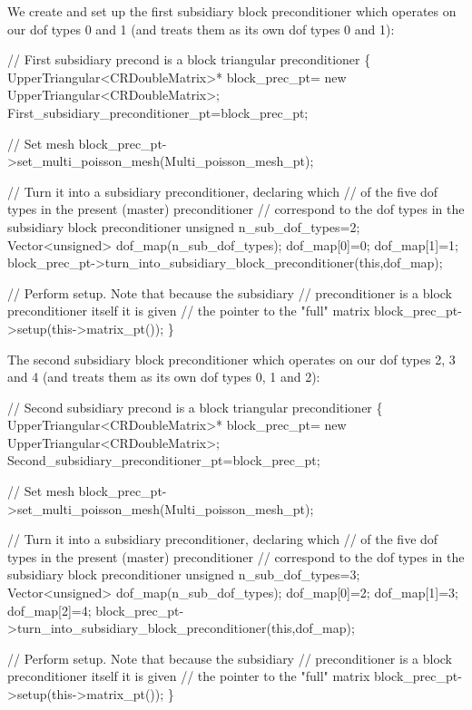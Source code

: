 We create and set up the first subsidiary block preconditioner which operates on our dof types 0 and 1 (and treats them as its own dof types 0 and 1)\+: 
\begin{DoxyCodeInclude}
  \textcolor{comment}{// First subsidiary precond is a block triangular preconditioner}
  \{
   UpperTriangular<CRDoubleMatrix>* block\_prec\_pt=
    \textcolor{keyword}{new} UpperTriangular<CRDoubleMatrix>;
   First\_subsidiary\_preconditioner\_pt=block\_prec\_pt;
  
   \textcolor{comment}{// Set mesh}
   block\_prec\_pt->set\_multi\_poisson\_mesh(Multi\_poisson\_mesh\_pt);
   
   \textcolor{comment}{// Turn it into a subsidiary preconditioner, declaring which}
   \textcolor{comment}{// of the five dof types in the present (master) preconditioner}
   \textcolor{comment}{// correspond to the dof types in the subsidiary block preconditioner}
   \textcolor{keywordtype}{unsigned} n\_sub\_dof\_types=2;
   Vector<unsigned> dof\_map(n\_sub\_dof\_types);
   dof\_map[0]=0;
   dof\_map[1]=1;
   block\_prec\_pt->turn\_into\_subsidiary\_block\_preconditioner(\textcolor{keyword}{this},dof\_map);

    \textcolor{comment}{// Perform setup. Note that because the subsidiary}
   \textcolor{comment}{// preconditioner is a block preconditioner itself it is given}
   \textcolor{comment}{// the pointer to the "full" matrix}
   block\_prec\_pt->setup(this->matrix\_pt());
  \}

\end{DoxyCodeInclude}


The second subsidiary block preconditioner which operates on our dof types 2, 3 and 4 (and treats them as its own dof types 0, 1 and 2)\+:


\begin{DoxyCodeInclude}
  \textcolor{comment}{// Second subsidiary precond is a block triangular preconditioner}
  \{
   UpperTriangular<CRDoubleMatrix>* block\_prec\_pt=
    \textcolor{keyword}{new} UpperTriangular<CRDoubleMatrix>;
   Second\_subsidiary\_preconditioner\_pt=block\_prec\_pt;
   
   \textcolor{comment}{// Set mesh}
   block\_prec\_pt->set\_multi\_poisson\_mesh(Multi\_poisson\_mesh\_pt);
   
   \textcolor{comment}{// Turn it into a subsidiary preconditioner, declaring which}
   \textcolor{comment}{// of the five dof types in the present (master) preconditioner}
   \textcolor{comment}{// correspond to the dof types in the subsidiary block preconditioner}
   \textcolor{keywordtype}{unsigned} n\_sub\_dof\_types=3;
   Vector<unsigned> dof\_map(n\_sub\_dof\_types);
   dof\_map[0]=2;
   dof\_map[1]=3;
   dof\_map[2]=4;
   block\_prec\_pt->turn\_into\_subsidiary\_block\_preconditioner(\textcolor{keyword}{this},dof\_map);
   
   \textcolor{comment}{// Perform setup. Note that because the subsidiary}
   \textcolor{comment}{// preconditioner is a block preconditioner itself it is given}
   \textcolor{comment}{// the pointer to the "full" matrix}
   block\_prec\_pt->setup(this->matrix\_pt());
  \}

\end{DoxyCodeInclude}



